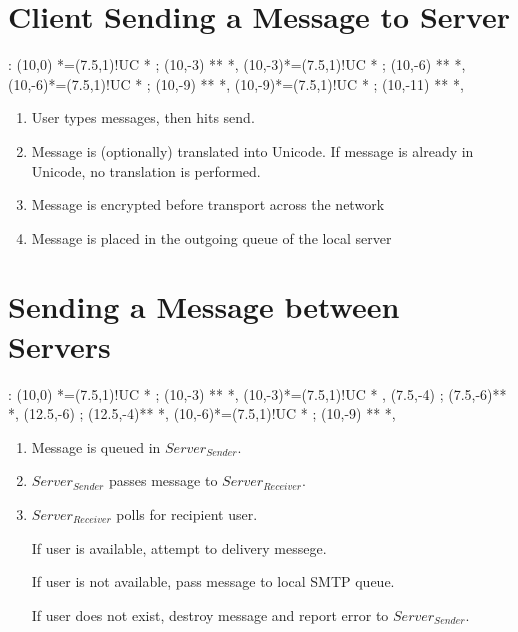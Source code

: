 \documentclass[a4paper,12pt]{article}
\begin{document}
\section{Client Sending a Message to Server}

\xy<1cm,0cm>:
(10,0) *=(7.5,1)!UC *\frm{-} ;
(10,-3) **\dir{-} *\dir{>},
(10,-3)*=(7.5,1)!UC *\frm{=} ; 
(10,-6) **\dir{-} *\dir{>},
(10,-6)*=(7.5,1)!UC *\frm{-} ; 
(10,-9) **\dir{-} *\dir{>},
(10,-9)*=(7.5,1)!UC *\frm{-} ; 
(10,-11) **\dir{=} *\dir{>},
\endxy

\begin{enumerate}

\item User types messages, then hits send.

\item Message is (optionally) translated into Unicode. If message is
already in Unicode, no translation is performed.

\item Message is encrypted before transport across the network

\item Message is placed in the outgoing queue of the local server

\end{enumerate}

\section{Sending a Message between Servers}

\xy<1cm,0cm>:
(10,0) *=(7.5,1)!UC *\frm{-} ;
(10,-3) **\dir{-} *\dir{>},
(10,-3)*=(7.5,1)!UC *\frm{-} , 
(7.5,-4) ; (7.5,-6)**\dir{-} *\dir{>},
(12.5,-6) ; (12.5,-4)**\dir{--} *\dir{>},
(10,-6)*=(7.5,1)!UC *\frm{-} ; 
(10,-9) **\dir{=} *\dir{>},
\endxy

\begin{enumerate}

\item Message is queued in $Server_{Sender}$.

\item $Server_{Sender}$ passes message to $Server_{Receiver}$.

\item $Server_{Receiver}$ polls for recipient user. 

\subitem If user is available, attempt to delivery messege. 

\subitem If user is not available, pass message to local SMTP queue. 

\subitem If user does not exist, destroy message and report error to $Server_{Sender}$.

\end{enumerate}
\end{document}
